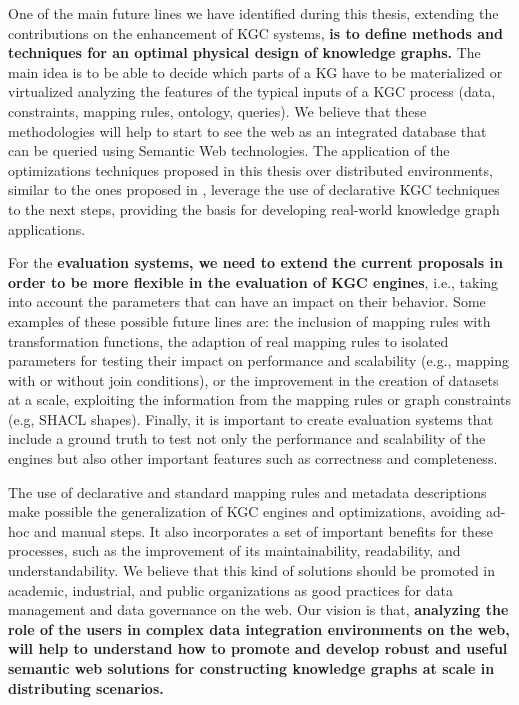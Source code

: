 One of the main future lines we have identified during this thesis, extending the contributions on the enhancement of KGC systems, \textbf{is to define methods and techniques for an optimal physical design of knowledge graphs.} The main idea is to be able to decide which parts of a KG have to be materialized or virtualized analyzing the features of the typical inputs of a KGC process (data, constraints, mapping rules, ontology, queries). We believe that these methodologies will help to start to see the web as an integrated database that can be queried using Semantic Web technologies. The application of the optimizations techniques proposed in this thesis over distributed environments, similar to the ones proposed in \citep{endris2019ontario,mami2019squerall}, leverage the use of declarative KGC techniques to the next steps, providing the basis for developing real-world knowledge graph applications.

For the \textbf{evaluation systems, we need to extend the current proposals in order to be more flexible in the evaluation of KGC engines}, i.e., taking into account the parameters that can have an impact on their behavior. Some examples of these possible future lines are: the inclusion of mapping rules with transformation functions, the adaption of real mapping rules to isolated parameters for testing their impact on performance and scalability (e.g., mapping with or without join conditions), or the improvement in the creation of datasets at a scale, exploiting the information from the mapping rules or graph constraints (e.g, SHACL shapes). Finally, it is important to create evaluation systems that include a ground truth to test not only the performance and scalability of the engines but also other important features such as correctness and completeness.

The use of declarative and standard mapping rules and metadata descriptions make possible the generalization of KGC engines and optimizations, avoiding ad-hoc and manual steps. It also incorporates a set of important benefits for these processes, such as the improvement of its maintainability, readability, and understandability. We believe that this kind of solutions should be promoted in academic, industrial, and public organizations as good practices for data management and data governance on the web. Our vision is that, \textbf{analyzing the role of the users in complex data integration environments on the web, will help to understand how to promote and develop robust and useful semantic web solutions for constructing knowledge graphs at scale in distributing scenarios.}

